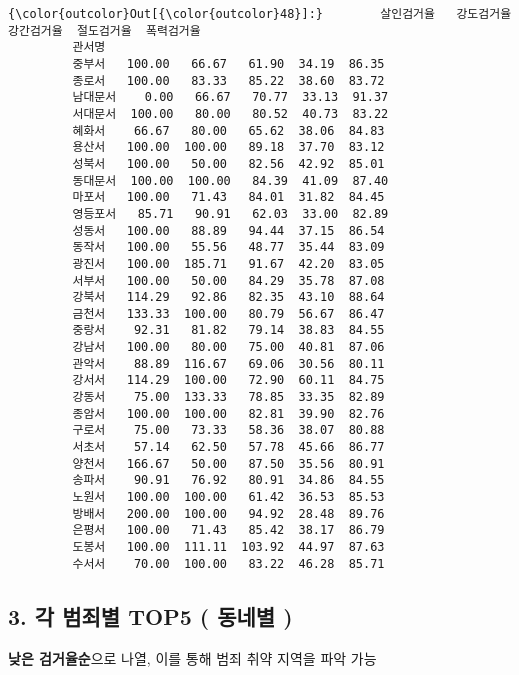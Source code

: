 \documentclass[11pt]{article}
\begin{document}
\begin{Verbatim}[commandchars=\\\{\}]
{\color{outcolor}Out[{\color{outcolor}48}]:}        살인검거율   강도검거율   강간검거율  절도검거율  폭력검거율
         관서명                                       
         중부서   100.00   66.67   61.90  34.19  86.35
         종로서   100.00   83.33   85.22  38.60  83.72
         남대문서    0.00   66.67   70.77  33.13  91.37
         서대문서  100.00   80.00   80.52  40.73  83.22
         혜화서    66.67   80.00   65.62  38.06  84.83
         용산서   100.00  100.00   89.18  37.70  83.12
         성북서   100.00   50.00   82.56  42.92  85.01
         동대문서  100.00  100.00   84.39  41.09  87.40
         마포서   100.00   71.43   84.01  31.82  84.45
         영등포서   85.71   90.91   62.03  33.00  82.89
         성동서   100.00   88.89   94.44  37.15  86.54
         동작서   100.00   55.56   48.77  35.44  83.09
         광진서   100.00  185.71   91.67  42.20  83.05
         서부서   100.00   50.00   84.29  35.78  87.08
         강북서   114.29   92.86   82.35  43.10  88.64
         금천서   133.33  100.00   80.79  56.67  86.47
         중랑서    92.31   81.82   79.14  38.83  84.55
         강남서   100.00   80.00   75.00  40.81  87.06
         관악서    88.89  116.67   69.06  30.56  80.11
         강서서   114.29  100.00   72.90  60.11  84.75
         강동서    75.00  133.33   78.85  33.35  82.89
         종암서   100.00  100.00   82.81  39.90  82.76
         구로서    75.00   73.33   58.36  38.07  80.88
         서초서    57.14   62.50   57.78  45.66  86.77
         양천서   166.67   50.00   87.50  35.56  80.91
         송파서    90.91   76.92   80.91  34.86  84.55
         노원서   100.00  100.00   61.42  36.53  85.53
         방배서   200.00  100.00   94.92  28.48  89.76
         은평서   100.00   71.43   85.42  38.17  86.79
         도봉서   100.00  111.11  103.92  44.97  87.63
         수서서    70.00  100.00   83.22  46.28  85.71
\end{Verbatim}
            
    \subsection{3. 각 범죄별 TOP5 ( 동네별
)}\label{uxac01-uxbc94uxc8c4uxbcc4-top5-uxb3d9uxb124uxbcc4}

\textbf{낮은 검거율순}으로 나열, 이를 통해 범죄 취약 지역을 파악 가능
\end{document}
